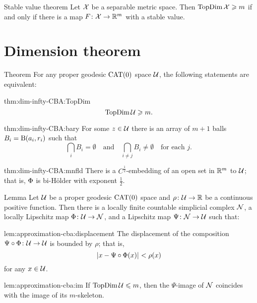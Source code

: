 \begin{thm}{Stable value theorem}\label{thm:stable-value}
Let $\mathcal{X}$ be a separable metric space.
Then $\mathop{\rm TopDim}\nolimits\mathcal{X}\geqslant m$ if and only if there is a map $F\colon\mathcal{X}\to\mathbb{R}^{m}$ with a stable value.
\end{thm}

\section{Dimension theorem}

\begin{thm}{Theorem}\label{thm:dim-infty-CBA}
For any proper geodesic $\mathrm{CAT}(0)$ space $\mathcal{U}$, the following statements are equivalent:

\begin{subthm}{thm:dim-infty-CBA:TopDim}
\[\mathop{\rm TopDim}\nolimits \mathcal{U}\geqslant m.\]
\end{subthm}

\begin{subthm}{thm:dim-infty-CBA:bary} 
For some $z\in \mathcal{U}$ there is an array of $m+1$ balls $B_i\z=\oBall(a_i,r_i)$ 
such that 
\[\bigcap_i B_i=\emptyset
\quad\text{and}\quad
\bigcap_{i\ne j} B_i\ne \emptyset
\quad \text{for each $j$}.\]

\end{subthm}


\begin{subthm}{thm:dim-infty-CBA:mnfld} 
There is a $C^{\frac{1}{2}}$-embedding of an open set in $\mathbb{R}^m$ to $\mathcal{U}$;
that is, $\Phi$ is bi-Hölder with exponent $\tfrac{1}{2}$.
\end{subthm}

\end{thm}


\begin{thm}{Lemma}\label{lem:approximation-cba}
Let $\mathcal{U}$ be a proper geodesic $\mathrm{CAT}(0)$ space
and $\rho\:\spc{U}\z\to\RR$ be a continuous positive function.
Then there is a locally finite countable simplicial complex $\mathcal{N}$,
a locally Lipschitz map $\map\:\spc{U}\z\to \spc{N}$, 
and a Lipschitz map $\Psi\colon\mathcal{N}\to\mathcal{U}$ such that:

\begin{subthm}{lem:approximation-cba:displacement}
The displacement of the composition $\Psi\circ\Phi\colon\mathcal{U}\to\mathcal{U}$ is bounded by $\rho$;
that is,
\[\dist{x}{\Psi\circ\map(x)}{}<\rho(x)\] 
for any $x\in\mathcal{U}$.
\end{subthm}

\begin{subthm}{lem:approximation-cba:im}
If $\mathop{\rm TopDim}\nolimits\mathcal{U}\leqslant m$, 
then the $\Psi$-image of $\mathcal{N}$ 
coincides with the image of its $m$-skeleton.
\end{subthm}

\end{thm}

